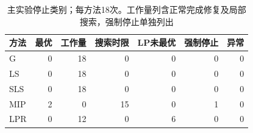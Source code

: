 \begin{table}[htbp]
\centering\small
\caption{主实验停止类别；每方法18次。工作量列含正常完成修复及局部搜索，强制停止单独列出}\label{tab:termination}
\begin{tabular}{lrrrrrr}\toprule
方法 & 最优 & 工作量 & 搜索时限 & LP未最优 & 强制停止 & 异常 \\\midrule
G & 0 & 18 & 0 & 0 & 0 & 0 \\
LS & 0 & 18 & 0 & 0 & 0 & 0 \\
SLS & 0 & 18 & 0 & 0 & 0 & 0 \\
MIP & 2 & 0 & 15 & 0 & 1 & 0 \\
LPR & 0 & 12 & 0 & 6 & 0 & 0 \\
\bottomrule\end{tabular}
\end{table}
